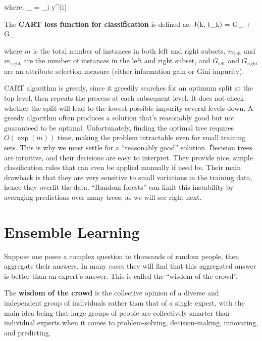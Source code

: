 where:
\bse
{}_ =  \sum_{i \in {}} y^{(i)}
\ese

The \textbf{CART loss function for classification} is defined as:
\bse
J(k, t_{k}) =  G_{} +  G_{}
\ese

where $m$ is the total number of instances in both left and right subsets, $m_{\text{left}}$ and $m_{\text{right}}$ are
the number of instances in the left and right subset, and $G_{\text{left}}$ and $G_{\text{right}}$ are an attribute
selection measure (either information gain or Gini impurity).
\ed

CART algorithm is greedy, since it greedily searches for an optimum split at the top level, then repeats the process
at each subsequent level. It does not check whether the split will lead to the lowest possible impurity
several levels down. A greedy algorithm often produces a solution that's reasonably good but not guaranteed to be
optimal. Unfortunately, finding the optimal tree requires $O(\exp(m))$ time, making the problem intractable even for
small training sets. This is why we must settle for a ``reasonably good'' solution. \v

Decision trees are intuitive, and their decisions are easy to interpret. They provide nice, simple classification
rules that can even be applied manually if need be. Their main drawback is that they are very sensitive to small
variations in the training data, hence they overfit the data. ``Random forests'' can limit this instability by
averaging predictions over many trees, as we will see right next.

\section{Ensemble Learning}

Suppose one poses a complex question to thousands of random people, then aggregate their answers. In many cases they
will find that this aggregated answer is better than an expert's answer. This is called the ``wisdom of the crowd''.

The \textbf{wisdom of the crowd} is the collective opinion of a diverse and independent group of individuals rather
than that of a single expert, with the main idea being that large groups of people are collectively smarter than
individual experts when it comes to problem-solving, decision-making, innovating, and predicting.
\ed


